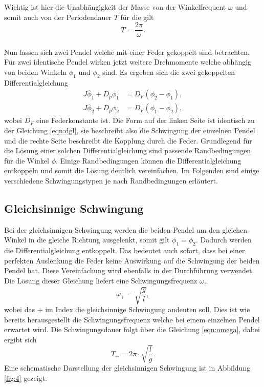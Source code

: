 Wichtig ist hier die Unabhängigkeit der Masse von der Winkelfrequent $\omega$ und somit auch von der Periodendauer $T$ für die gilt
\begin{equation}
    \label{eqn:omega}
T = \frac{2\pi}{\omega}.
\end{equation}
\\
\newline
Nun lassen sich zwei Pendel welche mit einer Feder gekoppelt sind betrachten. Für zwei identische Pendel wirken jetzt weitere Drehmomente welche abhängig von beiden Winkeln $\phi_{1}$ und $\phi_{2}$ sind. 
Es ergeben sich die zwei gekoppelten Differentialgleichung
\begin{align}
    \label{eqn:y1}
    J \ddot{{\phi_{1}}} + D_{p} \phi_{1} &=  D_{F} (\phi_{2}-\phi_{1}), \\
    \label{eqn:y2}
    J \ddot{{\phi_{2}}} + D_{p} \phi_{2} &= D_{F} (\phi_{1} - \phi_{2}),
\end{align}
wobei $D_{F}$ eine Federkonstante ist. Die Form auf der linken Seite ist identisch zu der Gleichung \eqref{eqn:dgl}, sie beschreibt also die Schwingung der einzelnen Pendel und die rechte Seite beschreibt die Kopplung
durch die Feder. Grundlegend für die Lösung einer solchen Differentialgleichung sind passende Randbedingungen für die Winkel $\phi$. Einige Randbedingungen können die Differentialgleichung entkoppeln und somit die Lösung
deutlich vereinfachen. Im Folgenden sind einige verschiedene Schwingungstypen je nach Randbedingungen erläutert.

\subsection{Gleichsinnige Schwingung}
Bei der gleichsinnigen Schwingung werden die beiden Pendel um den gleichen Winkel in die gleiche Richtung ausgelenkt, somit gilt $\phi_{1} = \phi_{2}$. Dadurch werden die Differentialgleichung entkoppelt.
Das bedeutet auch sofort, dass bei einer perfekten Auslenkung die Feder keine Auswirkung auf die Schwingung der beiden Pendel hat. Diese Vereinfachung wird ebenfalls in der Durchführung verwendet.
Die Lösung dieser Gleichung liefert eine Schwingungsfrequenz $\omega_{+}$
\begin{equation}
    \label{eqn:omegaeasy}
    \omega_{+} = \sqrt{\frac{g}{l}},
\end{equation}
wobei das $+$ im Index die gleichsinnige Schwingung andeuten soll. Dies ist wie bereits herausgestellt die Schwingungsfrequenz welche bei einem einzelnen Pendel erwartet wird.
Die Schwingungsdauer folgt über die Gleichung \eqref{eqn:omega}, dabei ergibt sich
\begin{equation}
T_{+} = 2\pi \cdot \sqrt{\frac{l}{g}}.
\end{equation}
Eine schematische Darstellung der gleichsinnigen Schwingung ist in Abbildung \ref{fig:4} gezeigt.

